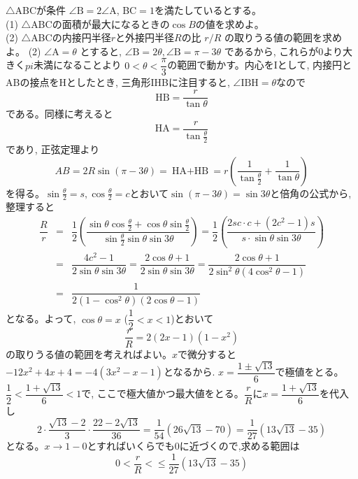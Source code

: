 $\triangle$ABCが条件 $\angle{\mbox{B}}=2\angle{\mbox{A}}$, BC$=1$を満たしているとする。\\
(1) $\triangle$ABCの面積が最大になるときの$\cos{B}$の値を求めよ。\\
(2) $\triangle$ABCの内接円半径$r$と外接円半径$R$の比 $r/R$ の取りうる値の範囲を求めよ。
\enthm
(2) $\angle{\mbox{A}}=\theta$ とすると, $\angle{\mbox{B}}=2\theta, 　\angle{\mbox{B}}=\pi-3\theta$ であるから, これらが0より大きく$pi$未満になることより $0<\theta<\dfrac{\pi}{3}$の範囲で動かす。内心をIとして, 内接円とABの接点をHとしたとき, 三角形IHBに注目すると, $\angle{\mbox{IBH}}=\theta$なので
\[\mbox{HB}=\dfrac{r}{\tan{\theta}}\]
である。同様に考えると
\[\mbox{HA}=\dfrac{r}{\tan{\frac{\theta}{2}}}\]
であり, 正弦定理より
\[AB=2R\sin{ (\pi-3\theta) } =\mbox{HA$+$HB} =r\left( \dfrac{1}{ \tan{\frac{\theta}{2} }}+\dfrac{1}{\tan{\theta}}\right)\]
を得る。$\sin{\frac{\theta}{2}}=s, \cos{\frac{\theta}{2}}=c$とおいて$\sin{(\pi-3\theta)=\sin{3\theta}}$と倍角の公式から,整理すると
\begin{eqnarray*}
\dfrac{R}{r}&=&\dfrac{1}{2}\left( \dfrac{\sin{\theta}\cos{\frac{\theta}{2}}  +\cos{\theta}\sin{ \frac{\theta}{2} }  }{\sin{\frac{\theta}{2}}\sin{\theta}\sin{3\theta}}\right)=\dfrac{1}{2}\left( \dfrac{2sc\cdot c + (2c^2-1)s}{s\cdot \sin{\theta} \sin{3\theta}}\right)\\
&=&\dfrac{4c^2-1}{2\sin{\theta}\sin{3\theta}} = \dfrac{2\cos{\theta}+1}{2\sin{\theta}\sin{3\theta}}=\dfrac{2\cos{\theta}+1}{2\sin^2{\theta}(4\cos^2{\theta}-1)}\\
&=&\dfrac{1}{2(1-\cos^2{\theta})(2\cos{\theta}-1)}
\end{eqnarray*}
となる。よって, $\cos{\theta}=x$ ($\dfrac{1}{2}<x<1$)とおいて
\[\dfrac{r}{R}=2(2x-1)(1-x^2)\]
の取りうる値の範囲を考えればよい。$x$で微分すると $-12x^2+4x+4=-4(3x^2-x-1)$となるから. $x=\dfrac{1\pm \sqrt{13}}{6}$で極値をとる。$\dfrac{1}{2}<\dfrac{1+\sqrt{13}}{6}<1$で, ここで極大値かつ最大値をとる。$\dfrac{r}{R}$に$x=\dfrac{1+\sqrt{13}}{6}$を代入し
\[2\cdot\dfrac{\sqrt{13}-2}{3}\cdot\dfrac{22-2\sqrt{13}}{36} = \dfrac{1}{54}(26\sqrt{13} -70)=\dfrac{1}{27}(13\sqrt{13}-35)\]
となる。$x\to 1-0$とすればいくらでも0に近づくので,求める範囲は
\[0<\dfrac{r}{R}<\leq \dfrac{1}{27}(13\sqrt{13}-35)\]
